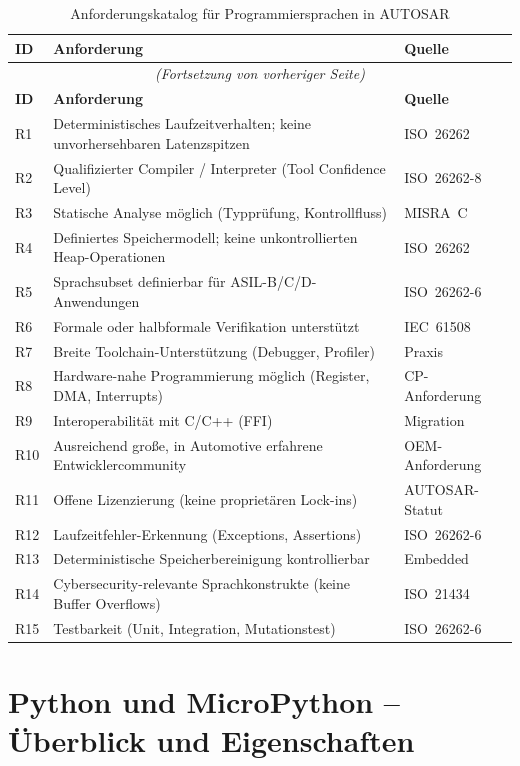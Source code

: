 ﻿\documentclass[12pt,a4paper,twoside]{article}
\begin{document}
\begin{longtable}{lp{8cm}l}
\caption{Anforderungskatalog für Programmiersprachen in AUTOSAR}
\label{tab:anforderungen}\\
\toprule
\textbf{ID} & \textbf{Anforderung} & \textbf{Quelle} \\
\midrule
\endfirsthead
\multicolumn{3}{c}{\small\itshape (Fortsetzung von vorheriger Seite)}\\
\toprule
\textbf{ID} & \textbf{Anforderung} & \textbf{Quelle} \\
\midrule
\endhead
\bottomrule
\endfoot
R1  & Deterministisches Laufzeitverhalten; keine unvorhersehbaren Latenzspitzen & ISO~26262 \\
R2  & Qualifizierter Compiler / Interpreter (Tool Confidence Level) & ISO~26262-8 \\
R3  & Statische Analyse möglich (Typprüfung, Kontrollfluss) & MISRA~C \\
R4  & Definiertes Speichermodell; keine unkontrollierten Heap-Operationen & ISO~26262 \\
R5  & Sprachsubset definierbar für ASIL-B/C/D-Anwendungen & ISO~26262-6 \\
R6  & Formale oder halbformale Verifikation unterstützt & IEC~61508 \\
R7  & Breite Toolchain-Unterstützung (Debugger, Profiler) & Praxis \\
R8  & Hardware-nahe Programmierung möglich (Register, DMA, Interrupts) & CP-Anforderung \\
R9  & Interoperabilität mit C/C++ (FFI) & Migration \\
R10 & Ausreichend große, in Automotive erfahrene Entwicklercommunity & OEM-Anforderung \\
R11 & Offene Lizenzierung (keine proprietären Lock-ins) & AUTOSAR-Statut \\
R12 & Laufzeitfehler-Erkennung (Exceptions, Assertions) & ISO~26262-6 \\
R13 & Deterministische Speicherbereinigung kontrollierbar & Embedded \\
R14 & Cybersecurity-relevante Sprachkonstrukte (keine Buffer Overflows) & ISO~21434 \\
R15 & Testbarkeit (Unit, Integration, Mutationstest) & ISO~26262-6 \\
\end{longtable}

\section{Python und MicroPython -- Überblick und Eigenschaften}
\label{sec:python_micropython}
\end{document}
